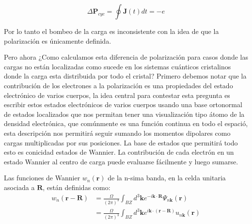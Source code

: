 \begin{equation}
    \Delta \textbf{P}_{cyc} = \oint \textbf{J}(t)dt = -e
\end{equation}

Por lo tanto el bombeo de la carga es inconsistente con la idea de que la polarización es únicamente  definida. 

Pero ahora ¿Como calculamos esta diferencia de polarización para casos donde las cargas no están localizadas como sucede en los sistemas cuánticos cristalinos donde la carga esta distribuida por todo el cristal? Primero debemos notar que la contribución de los electrones a la polarización es una propiedades del estado electrónico de varios cuerpos, la idea central para contestar esta pregunta es escribir estos estados electrónicos de varios cuerpos usando una base ortonormal  de estados localizados que nos permitan tener una visualización tipo átomo de la densidad electrónica, que comúnmente es una función continua en todo el espació, esta descripción nos permitirá seguir sumando los momentos dipolares como cargas multiplicadas por sus posiciones. La base de estados que permitirá todo esto es conicidad estados de Wannier. La contribución de cada electrón en un estado Wannier al centro de carga puede evaluarse fácilmente y luego sumarse.

Las funciones de Wannier $w_n(\textbf{r})$ de la n-sima banda, en la celda unitaria asociada a $\textbf{R}$, están definidas como:
\begin{equation}
\begin{split}
     w_n(\textbf{r} - \textbf{R}) &= \frac{\Omega}{(2\pi)^3} \int_{BZ} d^3\textbf{k} e^{-i \textbf{k} \cdot \textbf{R}} \Psi_{n\textbf{k}}(\textbf{r})\\
     &= \frac{\Omega}{(2\pi)^3} \int_{BZ} d^3\textbf{k} e^{i \textbf{k} \cdot (\textbf{r} - \textbf{R})} u_{n\textbf{k}}(\textbf{r})
\end{split}
\end{equation}


